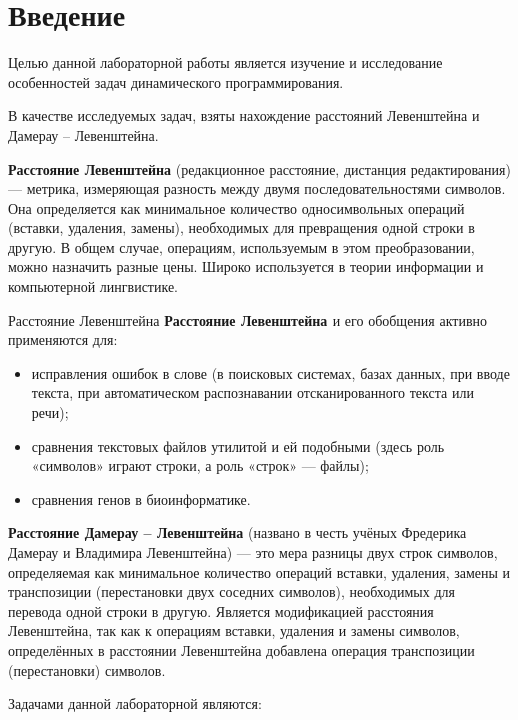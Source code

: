 \chapter*{Введение}

Целью данной лабораторной работы является изучение и исследование особенностей задач динамического программирования.

В качестве исследуемых задач, взяты нахождение расстояний Левенштейна и Дамерау -- Левенштейна.

\textbf{Расстояние Левенштейна}  (редакционное расстояние, дистанция редактирования) — метрика, измеряющая разность между двумя последовательностями символов. Она определяется как минимальное количество односимвольных операций (вставки, удаления, замены), необходимых для превращения одной строки в другую. В общем случае, операциям, используемым в этом преобразовании, можно назначить разные цены. Широко используется в теории информации и компьютерной лингвистике.

Расстояние Левенштейна \textbf{Расстояние Левенштейна \cite{Levenshtein}} и его обобщения активно применяются для:
\begin{itemize}
	\item исправления ошибок в слове (в поисковых системах, базах данных, при вводе текста, при автоматическом распознавании отсканированного текста или речи);
	\item сравнения текстовых файлов утилитой  и ей подобными (здесь роль «символов» играют строки, а роль «строк» — файлы);
	\item сравнения генов в биоинформатике.
\end{itemize}

\textbf{Расстояние Дамерау -- Левенштейна} (названо в честь учёных Фредерика Дамерау и Владимира Левенштейна) — это мера разницы двух строк символов, определяемая как минимальное количество операций вставки, удаления, замены и транспозиции (перестановки двух соседних символов), необходимых для перевода одной строки в другую. Является модификацией расстояния Левенштейна, так как к операциям вставки, удаления и замены символов, определённых в расстоянии Левенштейна добавлена операция транспозиции (перестановки) символов.

\newpage

Задачами данной лабораторной являются:

